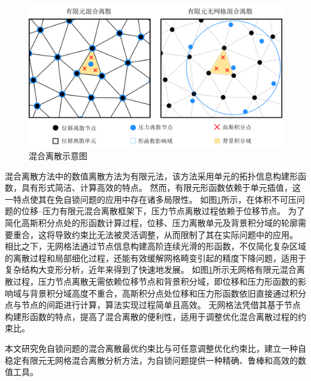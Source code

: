 \begin{figure}[!h]
    \centering 
        \includegraphics[scale=0.6]{figures/mix_ex.png}
        \caption{混合离散示意图}\label{ch_1:fig:mix}
\end{figure}
混合离散方法中的数值离散方法为有限元法，该方法采用单元的拓扑信息构建形函数，具有形式简洁、计算高效的特点。
然而，有限元形函数依赖于单元插值，这一特点使其在免自锁问题的应用中存在诸多局限性。
如图\ref{ch_1:fig:mix}所示，在体积不可压问题的位移--压力有限元混合离散框架下，压力节点离散过程依赖于位移节点。
为了简化高斯积分点处的形函数计算过程，位移、压力离散单元及背景积分域的轮廓需要重合，这将导致约束比无法被灵活调整，从而限制了其在实际问题中的应用。
相比之下，无网格法\cite{Belytschko1994,liu1995,zhang2004,chen2017}通过节点信息构建高阶连续光滑的形函数，不仅简化复杂区域的离散过程和局部细化过程，还能有效缓解网格畸变引起的精度下降问题，适用于复杂结构大变形分析，近年来得到了快速地发展\cite{liu2011,chen2014,yu2017,yang2016,wang2017,gao2019,wang2019,deng2019,chen2021,cao2020,li2020}。
如图\ref{ch_1:fig:mix}所示无网格有限元混合离散过程，压力节点离散无需依赖位移节点和背景积分域，即位移和压力形函数的影响域与背景积分域高度不重合，高斯积分点处位移和压力形函数依旧直接通过积分点与节点的间距进行计算，算法实现过程简单且高效。
无网格法凭借其基于节点构建形函数的特点，提高了混合离散的便利性，适用于调整优化混合离散过程的约束比。

本文研究免自锁问题的混合离散最优约束比与可任意调整优化约束比，建立一种自稳定有限元无网格混合离散分析方法，为自锁问题提供一种精确、鲁棒和高效的数值工具。
